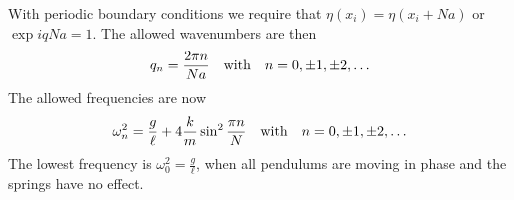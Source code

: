 \documentclass[letterpaper,11pt]{article}
\begin{document}
With periodic boundary conditions we require that $\eta(x_i) = \eta(x_i + N a)$ or $\exp iqNa = 1$.  The allowed wavenumbers are then
\begin{equation*}
 q_n = \frac{2 \pi n}{N a} \quad \hbox{with} \quad n = 0, \pm 1, \pm 2, \ldots
\end{equation*}
The allowed frequencies are now
\begin{equation*}
 \omega_n^2 = \frac{g}{\ell} + 4 \frac{k}{m} \sin^2 \frac{\pi n}{N} \quad \hbox{with} \quad n = 0, \pm 1, \pm 2, \ldots
\end{equation*}
The lowest frequency is $\omega_0^2 = \frac{g}{\ell}$, when all pendulums are moving in phase and the springs have no effect.
\end{document}
